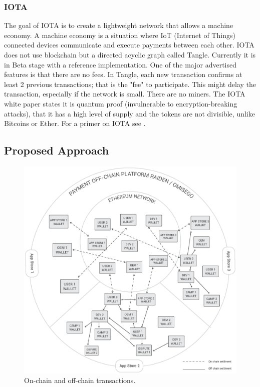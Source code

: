 \subsubsection{IOTA}
The goal of IOTA is to create a lightweight network that allows a machine economy. A machine economy is a situation where IoT (Internet of Things) connected devices communicate and execute payments between each other. IOTA does not use blockchain but a directed acyclic graph called Tangle. Currently it is in Beta stage with a reference implementation. One of the major advertised features is that there are no fees. In Tangle, each new transaction confirms at least 2 previous transactions; that is the "fee" to participate. This might delay the transaction, especially if the network is small. There are no miners. The IOTA white paper states it is quantum proof (invulnerable to encryption-breaking attacks), that it has a high level of supply and the tokens are not divisible, unlike Bitcoins or Ether. For a primer on IOTA see \cite{IOTA}.

\subsection{Proposed Approach}


\begin{figure}[!ht]
\centering
\includegraphics[width=\textwidth]{diagrams/offchain_wallets.eps}
\caption{On-chain and off-chain transactions.}
\label{fig:offchain}
\end{figure}


